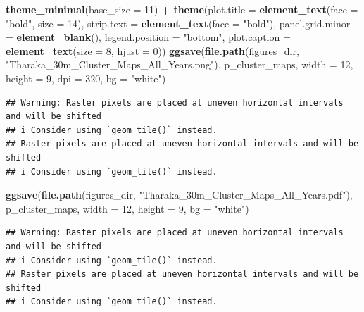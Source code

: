 \documentclass[
]{article}
\newenvironment{Shaded}{\begin{snugshade}}{\end{snugshade}}
\newcommand{\AttributeTok}[1]{\textcolor[rgb]{0.13,0.29,0.53}{#1}}
\newcommand{\DecValTok}[1]{\textcolor[rgb]{0.00,0.00,0.81}{#1}}
\newcommand{\FunctionTok}[1]{\textcolor[rgb]{0.13,0.29,0.53}{\textbf{#1}}}
\newcommand{\NormalTok}[1]{#1}
\newcommand{\SpecialCharTok}[1]{\textcolor[rgb]{0.81,0.36,0.00}{\textbf{#1}}}
\newcommand{\StringTok}[1]{\textcolor[rgb]{0.31,0.60,0.02}{#1}}
\begin{document}
\begin{Shaded}
\begin{Highlighting}[]
  \FunctionTok{theme\_minimal}\NormalTok{(}\AttributeTok{base\_size =} \DecValTok{11}\NormalTok{) }\SpecialCharTok{+}
  \FunctionTok{theme}\NormalTok{(}\AttributeTok{plot.title =} \FunctionTok{element\_text}\NormalTok{(}\AttributeTok{face =} \StringTok{"bold"}\NormalTok{, }\AttributeTok{size =} \DecValTok{14}\NormalTok{), }\AttributeTok{strip.text =} \FunctionTok{element\_text}\NormalTok{(}\AttributeTok{face =} \StringTok{"bold"}\NormalTok{),}
        \AttributeTok{panel.grid.minor =} \FunctionTok{element\_blank}\NormalTok{(), }\AttributeTok{legend.position =} \StringTok{"bottom"}\NormalTok{, }\AttributeTok{plot.caption =} \FunctionTok{element\_text}\NormalTok{(}\AttributeTok{size =} \DecValTok{8}\NormalTok{, }\AttributeTok{hjust =} \DecValTok{0}\NormalTok{))}
\FunctionTok{ggsave}\NormalTok{(}\FunctionTok{file.path}\NormalTok{(figures\_dir, }\StringTok{"Tharaka\_30m\_Cluster\_Maps\_All\_Years.png"}\NormalTok{), p\_cluster\_maps, }\AttributeTok{width =} \DecValTok{12}\NormalTok{, }\AttributeTok{height =} \DecValTok{9}\NormalTok{, }\AttributeTok{dpi =} \DecValTok{320}\NormalTok{, }\AttributeTok{bg =} \StringTok{"white"}\NormalTok{)}
\end{Highlighting}
\end{Shaded}

\begin{verbatim}
## Warning: Raster pixels are placed at uneven horizontal intervals and will be shifted
## i Consider using `geom_tile()` instead.
## Raster pixels are placed at uneven horizontal intervals and will be shifted
## i Consider using `geom_tile()` instead.
\end{verbatim}

\begin{Shaded}
\begin{Highlighting}[]
\FunctionTok{ggsave}\NormalTok{(}\FunctionTok{file.path}\NormalTok{(figures\_dir, }\StringTok{"Tharaka\_30m\_Cluster\_Maps\_All\_Years.pdf"}\NormalTok{), p\_cluster\_maps, }\AttributeTok{width =} \DecValTok{12}\NormalTok{, }\AttributeTok{height =} \DecValTok{9}\NormalTok{, }\AttributeTok{bg =} \StringTok{"white"}\NormalTok{)}
\end{Highlighting}
\end{Shaded}

\begin{verbatim}
## Warning: Raster pixels are placed at uneven horizontal intervals and will be shifted
## i Consider using `geom_tile()` instead.
## Raster pixels are placed at uneven horizontal intervals and will be shifted
## i Consider using `geom_tile()` instead.
\end{verbatim}
\end{document}
